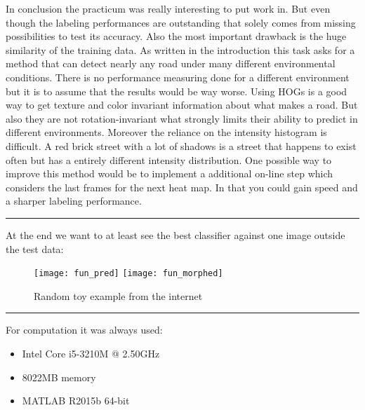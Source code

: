 In conclusion the practicum was really interesting to put work in. But even though the labeling performances are outstanding that solely comes from missing possibilities to test its accuracy. Also the most important drawback is the huge similarity of the training data. As written in the introduction this task asks for a method that can detect nearly any road under many different environmental conditions. There is no performance measuring done for a different environment but it is to assume that the results would be way worse. Using HOGs is a good way to get texture and color invariant information about what makes a road. But also they are not rotation-invariant what strongly limits their ability to predict in different environments. Moreover the reliance on the intensity histogram is difficult. A red brick street with a lot of shadows is a street that happens to exist often but has a entirely different intensity distribution. One possible way to improve this method would be to implement a additional on-line step which considers the last frames for the next heat map. In that you could gain speed and a sharper labeling performance.\\
\hrule
At the end we want to at least see the best classifier against one image outside the test data:
\begin{figure}[!h]
	\centering
	\texttt{[image: fun\_pred]}
	\texttt{[image: fun\_morphed]}
	\caption{Random toy example from the internet}
	\label{fig:fun}
\end{figure}
\hrule
\scriptsize
For computation it was always used:
\begin{itemize}
	\item[] Intel Core i5-3210M @ 2.50GHz
	\item[] 8022MB memory
	\item[] MATLAB R2015b 64-bit
\end{itemize}

